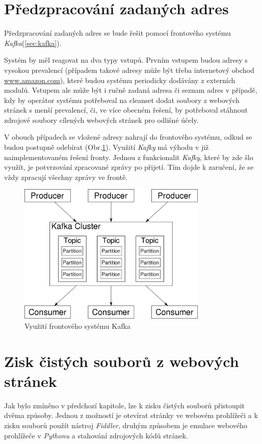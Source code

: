 \documentclass[thesis=M,czech,hidelinks]{FITthesis}[2013/05/06]
\begin{document}
\section{Předzpracování zadaných adres}
Předzpracování zadaných adres  se bude řešit pomocí frontového systému \textit{Kafka}(\ref{sec:kafka}).

Systém by měl reagovat na dva typy vstupů. Prvním vstupem budou adresy s vysokou prevalencí (případem takové adresy může být třeba internetový obchod \url{www.amazon.com}), které budou systému periodicky dodávány z externích modulů. Vstupem ale může být i ručně zadaná adresa či seznam adres v případě, kdy by operátor systému potřeboval na cleanset dodat soubory z webových stránek s menší prevalencí, či, ve více obecném řešení, by potřeboval stáhnout zdrojové soubory cílených webových stránek pro odlišné účely.

V obouch případech se vložené adresy nahrají do frontového systému, odkud se budou postupně odebírat (Obr.\ref{fig:kafka_schema}). Využití \textit{Kafky} má výhodu v již naimplementovaném řešení fronty. Jednou z funkcionalit \textit{Kafky}, které by zde šlo využít, je potvrzování zpracované zprávy po přijetí. Tím dojde k zaručení, že se vždy zpracují všechny zprávy ve frontě. 

\begin{figure}[h]
	\centering
	\includegraphics[width=9cm]{pictures/kafka.png}
	\caption{Využití frontového systému Kafka}
	\label{fig:kafka_schema}
\end{figure}




\section{Zisk čistých souborů z webových stránek}
Jak bylo zmíněno v předchozí kapitole, lze k zisku čistých souborů přistoupit dvěma způsoby. Jednou z možností je otevírat stránky ve webovém prohlížeči a k zisku souborů použít nástroj \textit{Fiddler}, druhým způsobem je emulace webového prohlížeče v \textit{Pythonu} a stahování zdrojových kódů stránek. 
\end{document}
